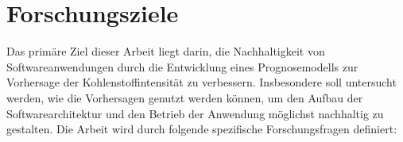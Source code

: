 %


\section{Forschungsziele}\label{CAP:goals}
Das primäre Ziel dieser Arbeit liegt darin, die Nachhaltigkeit von Softwareanwendungen durch die Entwicklung eines Prognosemodells zur Vorhersage der Kohlenstoffintensität zu verbessern.
Insbesondere soll untersucht werden, wie die Vorhersagen genutzt werden können, um den Aufbau der Softwarearchitektur und den Betrieb der Anwendung möglichst nachhaltig zu gestalten.
Die Arbeit wird durch folgende spezifische Forschungsfragen definiert:

